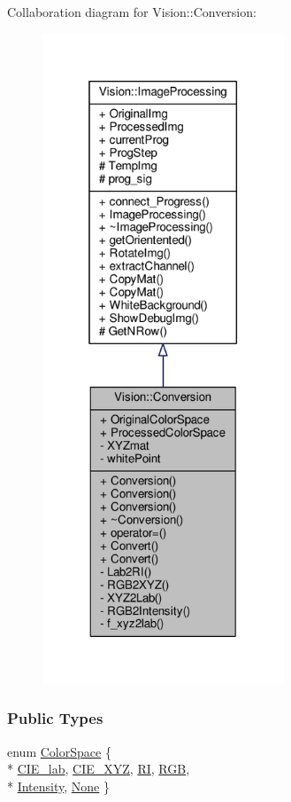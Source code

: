 Collaboration diagram for Vision\+:\+:Conversion\+:
\nopagebreak
\begin{figure}[H]
\begin{center}
\leavevmode
\includegraphics[height=550pt]{class_vision_1_1_conversion__coll__graph}
\end{center}
\end{figure}
\subsubsection*{Public Types}
\begin{DoxyCompactItemize}
\item 
enum \hyperlink{class_vision_1_1_conversion_a0a21d4ccbb013185f1974d35ec86e388}{Color\+Space} \{ \\*
\hyperlink{class_vision_1_1_conversion_a0a21d4ccbb013185f1974d35ec86e388afd9ec9933d500e5eeec6ce3359321b0e}{C\+I\+E\+\_\+lab}, 
\hyperlink{class_vision_1_1_conversion_a0a21d4ccbb013185f1974d35ec86e388ad4dfd3a535a86b69dd0e32ae7598b590}{C\+I\+E\+\_\+\+X\+Y\+Z}, 
\hyperlink{class_vision_1_1_conversion_a0a21d4ccbb013185f1974d35ec86e388addf2a4063c4fe27e2675fafccdcdd9c1}{R\+I}, 
\hyperlink{class_vision_1_1_conversion_a0a21d4ccbb013185f1974d35ec86e388af3fab43e1e6d8ffab1bf27050866a8d5}{R\+G\+B}, 
\\*
\hyperlink{class_vision_1_1_conversion_a0a21d4ccbb013185f1974d35ec86e388abfa5e56d2444f73ce850195468885fdd}{Intensity}, 
\hyperlink{class_vision_1_1_conversion_a0a21d4ccbb013185f1974d35ec86e388a471c24ee3ed6a2bce23140af4ee3a00d}{None}
 \}
\end{DoxyCompactItemize}
